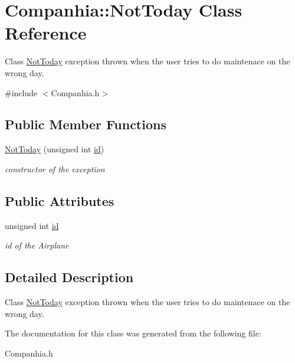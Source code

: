\hypertarget{class_companhia_1_1_not_today}{}\section{Companhia\+:\+:Not\+Today Class Reference}
\label{class_companhia_1_1_not_today}


Class \hyperlink{class_companhia_1_1_not_today}{Not\+Today} exception thrown when the user tries to do maintenace on the wrong day.  




{\ttfamily \#include $<$Companhia.\+h$>$}

\subsection*{Public Member Functions}
\begin{DoxyCompactItemize}
\item 
\mbox{\label{class_companhia_1_1_not_today_a1a2b3002d5569188270703be4942ed63}} 
\hyperlink{class_companhia_1_1_not_today_a1a2b3002d5569188270703be4942ed63}{Not\+Today} (unsigned int \hyperlink{class_companhia_1_1_not_today_a0e2192b8dbbf49234015467276c2d0aa}{id})
\begin{DoxyCompactList}\small\item\em constructor of the exception \end{DoxyCompactList}\end{DoxyCompactItemize}
\subsection*{Public Attributes}
\begin{DoxyCompactItemize}
\item 
\mbox{\label{class_companhia_1_1_not_today_a0e2192b8dbbf49234015467276c2d0aa}} 
unsigned int \hyperlink{class_companhia_1_1_not_today_a0e2192b8dbbf49234015467276c2d0aa}{id}
\begin{DoxyCompactList}\small\item\em id of the Airplane \end{DoxyCompactList}\end{DoxyCompactItemize}


\subsection{Detailed Description}
Class \hyperlink{class_companhia_1_1_not_today}{Not\+Today} exception thrown when the user tries to do maintenace on the wrong day. 

The documentation for this class was generated from the following file\+:\begin{DoxyCompactItemize}
\item 
Companhia.\+h\end{DoxyCompactItemize}

